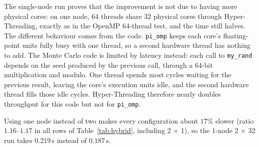 \documentclass[11pt,a4paper]{article}
\begin{document}
The single-node run proves that the improvement is not due to having more physical cores: on one node, 64 threads share 32 physical cores through Hyper-Threading, exactly as in the OpenMP 64-thread test, and the time still halves. The different behaviour comes from the code. \texttt{pi\_omp} keeps each core's floating-point units fully busy with one thread, so a second hardware thread has nothing to add. The Monte Carlo code is limited by latency instead: each call to \texttt{my\_rand} depends on the seed produced by the previous call, through a 64-bit multiplication and modulo. One thread spends most cycles waiting for the previous result, leaving the core's execution units idle, and the second hardware thread fills those idle cycles. Hyper-Threading therefore nearly doubles throughput for this code but not for \texttt{pi\_omp}.

Using one node instead of two makes every configuration about $17\%$ slower (ratio $1.16$--$1.17$ in all rows of Table~\ref{tab:hybrid}, including 2 $\times$ 1), so the 1-node 2 $\times$ 32 run takes $0.219$\,s instead of $0.187$\,s.
\end{document}
